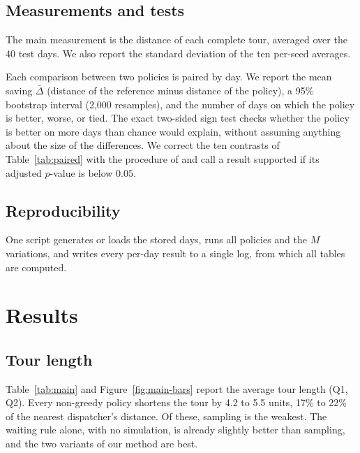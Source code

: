 \documentclass[5p,times,authoryear]{elsarticle}
\begin{document}
\subsection{Measurements and tests}

The main measurement is the distance of each complete tour, averaged over the 40 test days. We also report the standard deviation of the ten per-seed averages.

Each comparison between two policies is paired by day. We report the mean saving $\bar\Delta$ (distance of the reference minus distance of the policy), a 95\% bootstrap interval (2,000 resamples), and the number of days on which the policy is better, worse, or tied. The exact two-sided sign test checks whether the policy is better on more days than chance would explain, without assuming anything about the size of the differences. We correct the ten contrasts of Table~\ref{tab:paired} with the procedure of \citet{holm1979simple} and call a result supported if its adjusted $p$-value is below $0.05$.

\subsection{Reproducibility}

One script generates or loads the stored days, runs all policies and the $M$ variations, and writes every per-day result to a single log, from which all tables are computed.

\section{Results}
\label{sec:results}

\subsection{Tour length}
\label{sec:main-results}

Table~\ref{tab:main} and Figure~\ref{fig:main-bars} report the average tour length (Q1, Q2). Every non-greedy policy shortens the tour by 4.2 to 5.5 units, 17\% to 22\% of the nearest dispatcher's distance. Of these, sampling is the weakest. The waiting rule alone, with no simulation, is already slightly better than sampling, and the two variants of our method are best.
\end{document}

